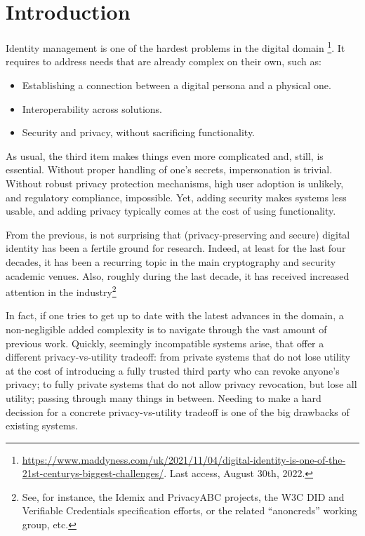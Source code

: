 \section{Introduction}
\label{sec:introduction}

Identity management is one of the hardest problems in the digital domain%
\footnote{\url{https://www.maddyness.com/uk/2021/11/04/digital-identity-is-one-of-the-21st-centurys-biggest-challenges/}. Last access, August 30th, 2022.}.
It requires to address needs that are already complex on their own, such as:

\begin{itemize}
\item Establishing a connection between a digital persona and a physical one.
\item Interoperability across solutions.
\item Security and privacy, without sacrificing functionality.
\end{itemize}

As usual, the third item makes things even more complicated and, still, is
essential. Without proper handling of one's secrets, impersonation is trivial.
Without robust privacy protection mechanisms, high user adoption is unlikely,
and regulatory compliance, impossible. Yet, adding security makes systems less
usable, and adding privacy typically comes at the cost of using functionality.

From the previous, is not surprising that (privacy-preserving and secure)
digital identity has been a fertile ground for research. Indeed, at least for
the last four decades, it has been a recurring topic in the main cryptography
and security academic venues. Also, roughly during the last decade, it has
received increased attention in the industry\footnote{See, for instance, the
  Idemix and PrivacyABC projects, the W3C DID and Verifiable Credentials
  specification efforts, or the related ``anoncreds'' working group, etc.}

In fact, if one tries to get up to date with the latest advances in the domain,
a non-negligible added complexity is to navigate through the vast amount of
previous work. Quickly, seemingly incompatible systems arise, that offer a
different privacy-vs-utility tradeoff: from private systems that do not lose
utility at the cost of introducing a fully trusted third party who can revoke
anyone's privacy; to fully private systems that do not allow privacy revocation,
but lose all utility; passing through many things in between. Needing to make a
hard decission for a concrete privacy-vs-utility tradeoff is one of the big
drawbacks of existing systems.

